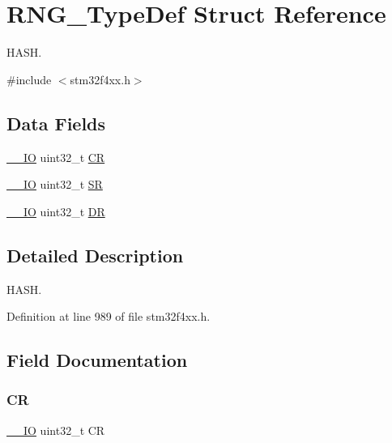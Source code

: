 \hypertarget{struct_r_n_g___type_def}{}\section{R\+N\+G\+\_\+\+Type\+Def Struct Reference}
\label{struct_r_n_g___type_def}


H\+A\+SH.  




{\ttfamily \#include $<$stm32f4xx.\+h$>$}

\subsection*{Data Fields}
\begin{DoxyCompactItemize}
\item 
\hyperlink{group___c_m_s_i_s__core__definitions_gaec43007d9998a0a0e01faede4133d6be}{\+\_\+\+\_\+\+IO} uint32\+\_\+t \hyperlink{struct_r_n_g___type_def_ab40c89c59391aaa9d9a8ec011dd0907a}{CR}
\item 
\hyperlink{group___c_m_s_i_s__core__definitions_gaec43007d9998a0a0e01faede4133d6be}{\+\_\+\+\_\+\+IO} uint32\+\_\+t \hyperlink{struct_r_n_g___type_def_af6aca2bbd40c0fb6df7c3aebe224a360}{SR}
\item 
\hyperlink{group___c_m_s_i_s__core__definitions_gaec43007d9998a0a0e01faede4133d6be}{\+\_\+\+\_\+\+IO} uint32\+\_\+t \hyperlink{struct_r_n_g___type_def_a3df0d8dfcd1ec958659ffe21eb64fa94}{DR}
\end{DoxyCompactItemize}


\subsection{Detailed Description}
H\+A\+SH. 

Definition at line 989 of file stm32f4xx.\+h.



\subsection{Field Documentation}
\mbox{\label{struct_r_n_g___type_def_ab40c89c59391aaa9d9a8ec011dd0907a}} 
\subsubsection{\texorpdfstring{CR}{CR}}
{\footnotesize\ttfamily \hyperlink{group___c_m_s_i_s__core__definitions_gaec43007d9998a0a0e01faede4133d6be}{\+\_\+\+\_\+\+IO} uint32\+\_\+t CR}

